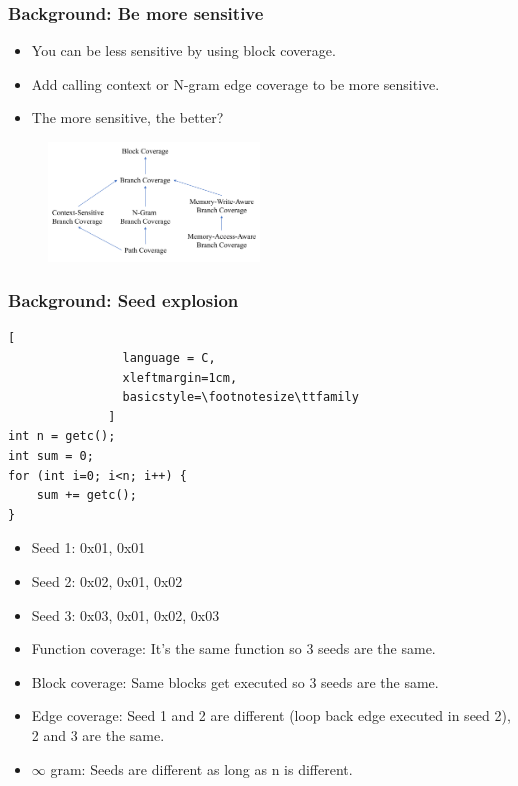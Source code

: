 \begin{frame}
	\frametitle{Background: Be more sensitive }
	\begin{itemize}
		\item You can be less sensitive by using block coverage.
		\item Add calling context or N-gram edge coverage to be more sensitive.
		\item The more sensitive, the better?
	\end{itemize}
	\begin{figure}
		\centering
		\includegraphics[width=0.5\textwidth]{figs/lattice.png}
	\end{figure}
\end{frame}

\begin{frame}[fragile]
	\frametitle{Background: Seed explosion}
	\begin{minipage}[t]{0.49\linewidth}
		\begin{lstlisting}[
				language = C, 
				xleftmargin=1cm,
				basicstyle=\footnotesize\ttfamily
			  ]
int n = getc();
int sum = 0;
for (int i=0; i<n; i++) {
	sum += getc();
}
			  \end{lstlisting}
		\begin{itemize}
			\item Seed 1: 0x01, 0x01
			\item Seed 2: 0x02, 0x01, 0x02
			\item Seed 3: 0x03, 0x01, 0x02, 0x03
		\end{itemize}
	\end{minipage}
	\begin{minipage}[t]{0.49\linewidth}
		\begin{itemize}
			\item Function coverage: It's the same function so 3 seeds are the same.
			\item Block coverage: Same blocks get executed so 3 seeds are the same.
			\item Edge coverage: Seed 1 and 2 are different (loop back edge executed in seed 2), 2 and 3 are the same.
			\item $\infty$ gram: Seeds are different as long as n is different.
		\end{itemize}
	\end{minipage}
\end{frame}
